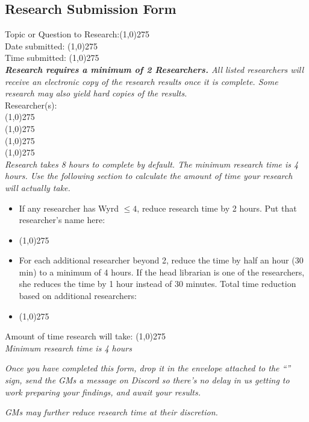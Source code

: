\documentclass[white]{gl2018}
\begin{document}
\name{\wResearchForm{}}
\begin{center}\section*{Research Submission Form}\end{center}

{\large Topic or Question to Research:}\line(1,0){275}\\
Date submitted:  \line(1,0){275}\\
Time submitted:  \line(1,0){275}\\

\emph{{\bf Research requires a minimum of 2 Researchers.} All listed researchers will receive an electronic copy of the research results once it is complete. Some research may also yield hard copies of the results.}\\
Researcher(s):\\
\line(1,0){275} \\
\line(1,0){275} \\
\line(1,0){275} \\
\line(1,0){275} \\

\emph{Research takes 8 hours to complete by default. The minimum research time is 4 hours. Use the following section to calculate the amount of time your research will actually take.}
\begin{itemize} 
	\item If any researcher has Wyrd $\le 4$, reduce research time by 2 hours.  Put that researcher's name here:
	\item\line(1,0){275}
	\item For each additional researcher beyond 2, reduce the time by half an hour (30 min) to a minimum of 4 hours. If the head librarian is one of the researchers, she reduces the time by 1 hour instead of 30 minutes. Total time reduction based on additional researchers:
	\item\line(1,0){275}
\end{itemize}
Amount of time research will take: \line(1,0){275}\\
\emph{Minimum research time is 4 hours}

\emph{Once you have completed this form, drop it in the envelope attached to the ``\sResearchFormSubmission{\MYname{}}'' sign, send the GMs a message on Discord so there's no delay in us getting to work preparing your findings, and await your results.}

{\it GMs may further reduce research time at their discretion.}
\end{document}
